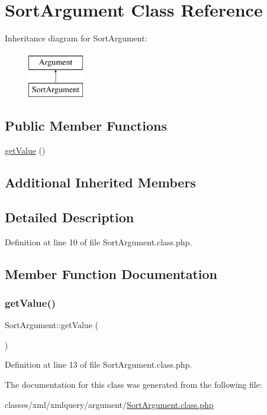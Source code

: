 \hypertarget{classSortArgument}{}\section{Sort\+Argument Class Reference}
\label{classSortArgument}
Inheritance diagram for Sort\+Argument\+:\begin{figure}[H]
\begin{center}
\leavevmode
\includegraphics[height=2.000000cm]{classSortArgument}
\end{center}
\end{figure}
\subsection*{Public Member Functions}
\begin{DoxyCompactItemize}
\item 
\hyperlink{classSortArgument_a8894d7257159d72f72bbf0732df72385}{get\+Value} ()
\end{DoxyCompactItemize}
\subsection*{Additional Inherited Members}


\subsection{Detailed Description}


Definition at line 10 of file Sort\+Argument.\+class.\+php.



\subsection{Member Function Documentation}
\mbox{\label{classSortArgument_a8894d7257159d72f72bbf0732df72385}} 
\subsubsection{\texorpdfstring{get\+Value()}{getValue()}}
{\footnotesize\ttfamily Sort\+Argument\+::get\+Value (\begin{DoxyParamCaption}{ }\end{DoxyParamCaption})}



Definition at line 13 of file Sort\+Argument.\+class.\+php.



The documentation for this class was generated from the following file\+:\begin{DoxyCompactItemize}
\item 
classes/xml/xmlquery/argument/\hyperlink{SortArgument_8class_8php}{Sort\+Argument.\+class.\+php}\end{DoxyCompactItemize}

